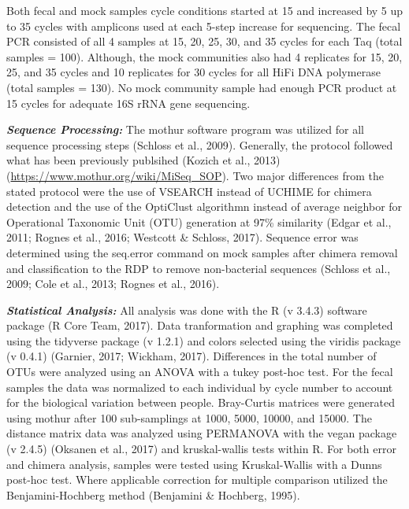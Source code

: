 \documentclass[12pt,]{article}
\begin{document}
Both fecal and mock samples cycle conditions started at 15 and increased
by 5 up to 35 cycles with amplicons used at each 5-step increase for
sequencing. The fecal PCR consisted of all 4 samples at 15, 20, 25, 30,
and 35 cycles for each Taq (total samples = 100). Although, the mock
communities also had 4 replicates for 15, 20, 25, and 35 cycles and 10
replicates for 30 cycles for all HiFi DNA polymerase (total samples =
130). No mock community sample had enough PCR product at 15 cycles for
adequate 16S rRNA gene sequencing.

\textbf{\emph{Sequence Processing:}} The mothur software program was
utilized for all sequence processing steps (Schloss et al., 2009).
Generally, the protocol followed what has been previously publsihed
(Kozich et al., 2013) (\url{https://www.mothur.org/wiki/MiSeq_SOP}). Two
major differences from the stated protocol were the use of VSEARCH
instead of UCHIME for chimera detection and the use of the OptiClust
algorithmn instead of average neighbor for Operational Taxonomic Unit
(OTU) generation at 97\% similarity (Edgar et al., 2011; Rognes et al.,
2016; Westcott \& Schloss, 2017). Sequence error was determined using
the seq.error command on mock samples after chimera removal and
classification to the RDP to remove non-bacterial sequences (Schloss et
al., 2009; Cole et al., 2013; Rognes et al., 2016).

\textbf{\emph{Statistical Analysis:}} All analysis was done with the R
(v 3.4.3) software package (R Core Team, 2017). Data tranformation and
graphing was completed using the tidyverse package (v 1.2.1) and colors
selected using the viridis package (v 0.4.1) (Garnier, 2017; Wickham,
2017). Differences in the total number of OTUs were analyzed using an
ANOVA with a tukey post-hoc test. For the fecal samples the data was
normalized to each individual by cycle number to account for the
biological variation between people. Bray-Curtis matrices were generated
using mothur after 100 sub-samplings at 1000, 5000, 10000, and 15000.
The distance matrix data was analyzed using PERMANOVA with the vegan
package (v 2.4.5) (Oksanen et al., 2017) and kruskal-wallis tests within
R. For both error and chimera analysis, samples were tested using
Kruskal-Wallis with a Dunns post-hoc test. Where applicable correction
for multiple comparison utilized the Benjamini-Hochberg method
(Benjamini \& Hochberg, 1995).
\end{document}
